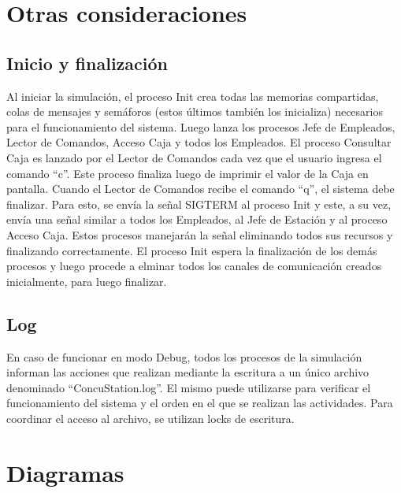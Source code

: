 \documentclass{article}
\begin{document}
\section{Otras consideraciones}
\subsection{Inicio y finalización}
Al iniciar la simulación, el proceso Init crea todas las memorias compartidas, colas de mensajes y semáforos (estos últimos también los inicializa) necesarios para el funcionamiento del sistema. Luego lanza los procesos Jefe de Empleados, Lector de Comandos, Acceso Caja y todos los Empleados. El proceso Consultar Caja es lanzado por el Lector de Comandos cada vez que el usuario ingresa el comando ``c''. Este proceso finaliza luego de imprimir el valor de la Caja en pantalla.
Cuando el Lector de Comandos recibe el comando ``q'', el sistema debe finalizar. Para esto, se envía la señal SIGTERM al proceso Init y este, a su vez, envía una señal similar a todos los Empleados, al Jefe de Estación y al proceso Acceso Caja. Estos procesos manejarán la señal eliminando todos sus recursos y finalizando correctamente. El proceso Init espera la finalización de los demás procesos y luego procede a elminar todos los canales de comunicación creados inicialmente, para luego finalizar.
\subsection{Log}
En caso de funcionar en modo Debug, todos los procesos de la simulación informan las acciones que realizan mediante la escritura a un único archivo denominado ``ConcuStation.log''. El mismo puede utilizarse para verificar el funcionamiento del sistema y el orden en el que se realizan las actividades. Para coordinar el acceso al archivo, se utilizan locks de escritura.

\section{Diagramas}
\end{document}
